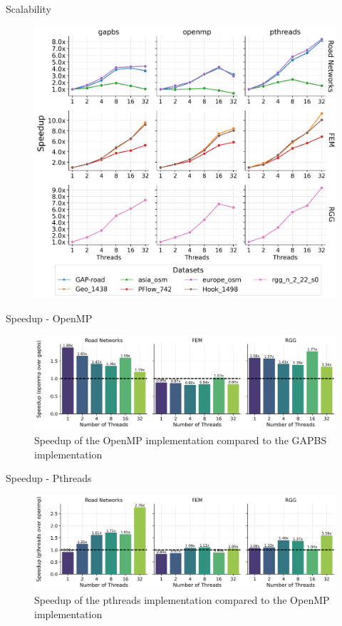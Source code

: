 \begin{frame}{Scalability}
\begin{figure}
  \centering
  \includegraphics[width=0.6\linewidth]{images/scalability.png}
\end{figure}
\end{frame}

\begin{frame}{Speedup - OpenMP}
\begin{figure}
  \centering
  \includegraphics[width=0.8\linewidth]{images/speedup_openmp.png}
  \caption{Speedup of the OpenMP implementation compared to the GAPBS implementation}
\end{figure}
\end{frame}

\begin{frame}{Speedup - Pthreads}
\begin{figure}
  \centering
  \includegraphics[width=0.8\linewidth]{images/speedup_pthreads.png}
  \caption{Speedup of the pthreads implementation compared to the OpenMP implementation}
\end{figure}
\end{frame}


